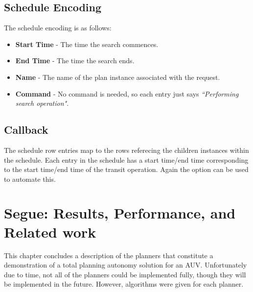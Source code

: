 \subsection{Schedule Encoding}
The schedule encoding is as follows:
\begin{itemize}
\item \textbf{Start Time} - The time the search commences.
\item \textbf{End Time} - The time the search ends.
\item \textbf{Name} - The name of the plan instance associated with the  request.
\item \textbf{Command} - No command is needed, so each entry just says \textit{``Performing search operation"}.
\end{itemize}

\subsection{Callback }
The  schedule row entries map to the rows referecing the children  instances within the  schedule. Each entry in the  schedule has a start time/end time corresponding to the start time/end time of the transit operation. Again the  option can be used to automate this.

\section{Segue: Results, Performance, and Related work}
This chapter concludes a description of the planners that constitute a demonstration of a  total planning autonomy solution for an AUV. Unfortunately due to time, not all of the planners could be implemented fully, though they will be implemented in the future. However, algorithms were given for each planner.

